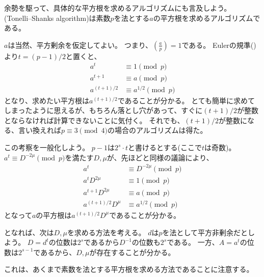余勢を駆って、具体的な平方根を求めるアルゴリズムにも言及しよう。
(Tonelli–Shanks algorithm)は素数$p$を法とする$a$の平方根を求めるアルゴリズムである。

$a$は当然、平方剰余を仮定してよい。
つまり、$\left(\frac{a}{p}\right)=1$である。
Eulerの規準()より$t=(p-1)/2$と置くと、
\begin{align*}
a^t &\equiv 1 \pmod{p}\\
a^{t+1} &\equiv a \pmod{p}\\
a^{(t+1)/2} &\equiv a^{1/2} \pmod{p}
\end{align*}
となり、求めたい平方根は$a^{(t+1)/2}$であることが分かる。
とても簡単に求めてしまったように思えるが、もちろん落とし穴があって、すぐに$(t+1)/2$が整数とならなければ計算できないことに気付く。
それでも、$(t+1)/2$が整数になる、言い換えれば$p\equiv3\pmod{4}$の場合のアルゴリズムは得た。

この考察を一般化しよう。
$p-1$は$2^s\cdot t$と書けるとする(ここで$t$は奇数)。
$a^t \equiv D^{-2\mu}\pmod{p}$を満たす$D,\mu$が、先ほどと同様の議論により、
\begin{align*}
a^t &\equiv D^{-2\mu}\pmod{p}\\
a^tD^{2\mu} &\equiv 1 \pmod{p}\\
a^{t+1}D^{2\mu} &\equiv a \pmod{p}\\
a^{(t+1)/2}D^{\mu} &\equiv a^{1/2} \pmod{p}
\end{align*}
となって$a$の平方根は$a^{(t+1)/2}D^{\mu}$であることが分かる。

となれば、次は$D,\mu$を求める方法を考える。
$d$は$p$を法として平方非剰余だとしよう。
$D=d^t$の位数は$2^s$であるから$D^{-1}$の位数も$2^s$である。
一方、$A=a^t$の位数は$2^{s-1}$であるから、$D,\mu$が存在することが分かる。


これは、あくまで素数を法とする平方根を求める方法であることに注意する。
